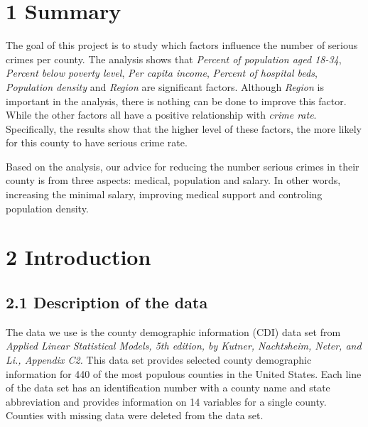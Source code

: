 \documentclass[oneside,11pt]{homework}
\begin{document}
\maketitle

\section{}

\section*{1 Summary}

The goal of this project is to study which factors influence the number of serious crimes per county. The analysis shows that \textit{Percent of population aged 18-34}, \textit{Percent below poverty level}, \textit{Per capita income}, \textit{Percent of hospital beds}, \textit{Population density} and \textit{Region} are significant factors. Although \textit{Region} is important in the analysis, there is nothing can be done to improve this factor. While the other factors all have a positive relationship with \textit{crime rate}. Specifically, the results show that the higher level of these factors, the more likely for this county to have serious crime rate.\par
Based on the analysis, our advice for reducing the number serious crimes in their county is from three aspects: medical, population and salary. In other words, increasing the minimal salary, improving medical support and controling population density.

\section*{2 Introduction}
\subsection*{2.1 Description of the data}
The data we use is the county demographic information (CDI) data set from \textit{Applied Linear Statistical Models, 5th edition, by Kutner, Nachtsheim, Neter, and Li., Appendix C2.} This data set provides selected county demographic information for 440 of the most populous counties in the United States. Each line of the data set has an identification number with a county name and state abbreviation and provides information on 14 variables for a single county. Counties with missing data were deleted from the data set.\par
\end{document}
